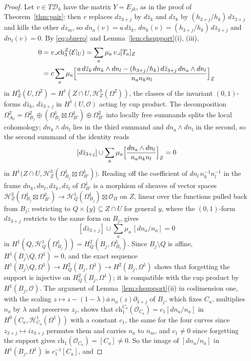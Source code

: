 \documentclass[11pt,reqno]{amsart}
\numberwithin{equation}{section}
\theoremstyle{plain}
\theoremstyle{definition}
\newcommand{\ch}{\mathrm{ch}}
\newcommand{\cD}{\mathcal{D}}
\begin{document}
\begin{proof}
Let $v\in T\cD_{h}$ have the matrix $Y=E_{jk}$, as in the proof of Theorem~\ref{thm:pair}: then $v$ replaces $dz_{3+j}$ by $d\bar z_{k}$ and $dz_{k}$ by $(h_{3+j}/h_{k})\,d\bar z_{3+j}$ and kills the other $dz_{m}$, so $dn_{a}(v)=a\,d\bar z_{k}$, $dn_{k}(v)=(h_{3+j}/h_{k})\,d\bar z_{3+j}$ and $dn_{l}(v)=0$. By \eqref{eq:obzero} and Lemma~\ref{lem:chsupport}(i), (iii),
\begin{align*}
0&=v\lrcorner\ch^{Z}_{3}(\mathcal{E}|_{U})=\sum_{a}\mu_{a}\,v\lrcorner[T_{a}]_{Z}\\
&=c\sum_{a}\mu_{a}\Bigl[\frac{a\,d\bar z_{k}\,dn_{k}\wedge dn_{l}-(h_{3+j}/h_{k})\,d\bar z_{3+j}\,dn_{a}\wedge dn_{l}}{n_{a}n_{k}n_{l}}\Bigr]_{Z}
\end{align*}
in $H^{4}_{Z}(U,\Omega^{2})=H^{1}(Z\cap U,\mathcal{H}^{3}_{Z}(\Omega^{2}))$, the classes of the invariant $(0,1)$-forms $d\bar z_{k}$, $d\bar z_{3+j}$ in $H^{1}(U,\mathcal{O})$ acting by cup product. The decomposition $\Omega^{2}_{A_{0}}=\Omega^{2}_{B_{j}}\oplus(\Omega^{1}_{B_{j}}\boxtimes\Omega^{1}_{B'})\oplus\Omega^{2}_{B'}$ into locally free summands splits the local cohomology; $dn_{k}\wedge dn_{l}$ lies in the third summand and $dn_{a}\wedge dn_{l}$ in the second, so the second summand of the identity reads
\[
[d\bar z_{3+j}]\cup\sum_{a}\mu_{a}\Bigl[\frac{dn_{a}\wedge dn_{l}}{n_{a}n_{k}n_{l}}\Bigr]_{Z}=0
\]
in $H^{1}\bigl(Z\cap U,\mathcal{H}^{3}_{Z}(\Omega^{1}_{B_{j}}\boxtimes\Omega^{1}_{B'})\bigr)$.
Reading off the coefficient of $dn_{l}\,n_{k}^{-1}n_{l}^{-1}$ in the frame $dn_{k},dn_{l},dz_{k},dz_{l}$ of $\Omega^{1}_{B'}$ is a morphism of sheaves of vector spaces $\mathcal{H}^{3}_{Z}(\Omega^{1}_{B_{j}}\boxtimes\Omega^{1}_{B'})\to\mathcal{H}^{1}_{Q}(\Omega^{1}_{B_{j}})\boxtimes\mathcal{O}_{\Pi}$ on $Z$, linear over the functions pulled back from $B_{j}$; restricting to $Q\times\{y\}\subseteq Z\cap U$ for general $y$, where the $(0,1)$-form $d\bar z_{3+j}$ restricts to the same form on $B_{j}$, gives
\[
[d\bar z_{3+j}]\cup\sum_{a}\mu_{a}\,[dn_{a}/n_{a}]=0
\]
in $H^{1}(Q,\mathcal{H}^{1}_{Q}(\Omega^{1}_{B_{j}}))=H^{2}_{Q}(B_{j},\Omega^{1}_{B_{j}})$.
Since $B_{j}\setminus Q$ is affine, $H^{1}(B_{j}\setminus Q,\Omega^{1})=0$, and the exact sequence $H^{1}(B_{j}\setminus Q,\Omega^{1})\to H^{2}_{Q}(B_{j},\Omega^{1})\to H^{2}(B_{j},\Omega^{1})$ shows that forgetting the support is injective on $H^{2}_{Q}(B_{j},\Omega^{1})$; it is compatible with the cup product by $H^{1}(B_{j},\mathcal{O})$. The argument of Lemma~\ref{lem:chsupport}(ii) in codimension one, with the scaling $z\mapsto z-(1-\lambda)\bar a\,n_{a}(z)\partial_{3+j}$ of $B_{j}$, which fixes $C_{a}$, multiplies $n_{a}$ by $\lambda$ and preserves $z_{j}$, shows that $\ch^{C_{a}}_{1}(\mathcal{O}_{C_{a}})=c_{1}[dn_{a}/n_{a}]$ in $H^{0}(C_{a},\mathcal{H}^{1}_{C_{a}}(\Omega^{1}))$ with a constant $c_{1}$, the same for the four curves since $z_{3+j}\mapsto iz_{3+j}$ permutes them and carries $n_{a}$ to $n_{ia}$, and $c_{1}\ne0$ since forgetting the support gives $\ch_{1}(\mathcal{O}_{C_{a}})=[C_{a}]\ne0$. So the image of $[dn_{a}/n_{a}]$ in $H^{1}(B_{j},\Omega^{1})$ is $c_{1}^{-1}[C_{a}]$, and

\end{proof}
\end{document}
